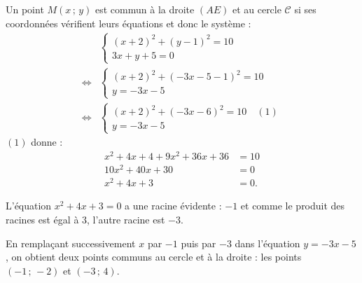 \documentclass[10pt]{article}
\begin{document}
Un point \(M(x\,;\,y)\) est commun à la droite \((AE)\) et au cercle \(\mathcal{C}\) si ses coordonnées vérifient leurs équations et donc le système :
\begin{align*}
&\begin{cases}
(x + 2)^2 + (y - 1)^2 = 10 \\
3x + y + 5 = 0
\end{cases} \\
\iff &\begin{cases}
(x + 2)^2 + (-3x - 5 - 1)^2 = 10 \\
y = -3x - 5
\end{cases} \\
\iff &\begin{cases}
(x + 2)^2 + (-3x - 6)^2 = 10 \quad (1)\\
y = -3x - 5
\end{cases}
\end{align*}
\((1)\) donne :
\begin{align*}
x^2 + 4x + 4 + 9x^2 + 36x + 36 &= 10 \\
10x^2 + 40x + 30 &= 0 \\
x^2 + 4x + 3 &= 0.
\end{align*}

L'équation \(x^2 + 4x + 3 = 0\) a une racine évidente : \(-1\) et comme le produit des racines est égal à 3, l'autre racine est \(-3\).

En remplaçant successivement \(x\) par \(-1\) puis par \(-3\) dans l'équation \(y = -3x - 5\), on obtient deux points communs au cercle et à la droite : les points \((-1 \,;\, -2)\) et \((-3 \,;\, 4)\).
\end{document}
